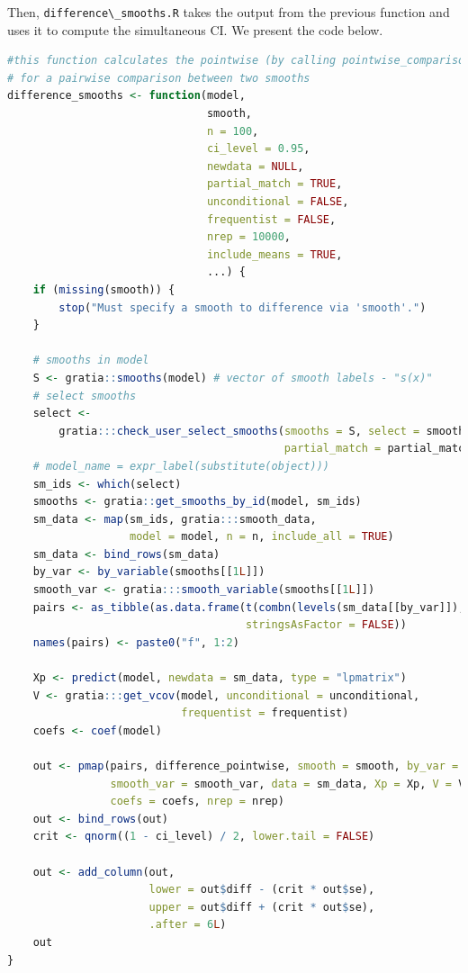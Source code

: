 \documentclass[
]{article}
\newcommand{\passthrough}[1]{#1}
\begin{document}
Then, \passthrough{\lstinline!difference\_smooths.R!} takes the output from the previous function and uses it to compute the simultaneous CI.
We present the code below.

\begin{lstlisting}[language=R]
#this function calculates the pointwise (by calling pointwise_comparisons.R) CI and the simultaneous CI
# for a pairwise comparison between two smooths
difference_smooths <- function(model,
                               smooth,
                               n = 100,
                               ci_level = 0.95,
                               newdata = NULL,
                               partial_match = TRUE,
                               unconditional = FALSE,
                               frequentist = FALSE,
                               nrep = 10000,
                               include_means = TRUE,
                               ...) {
    if (missing(smooth)) {
        stop("Must specify a smooth to difference via 'smooth'.")
    }

    # smooths in model
    S <- gratia::smooths(model) # vector of smooth labels - "s(x)"
    # select smooths
    select <-
        gratia:::check_user_select_smooths(smooths = S, select = smooth,
                                           partial_match = partial_match)#,
    # model_name = expr_label(substitute(object)))
    sm_ids <- which(select)
    smooths <- gratia::get_smooths_by_id(model, sm_ids)
    sm_data <- map(sm_ids, gratia:::smooth_data,
                   model = model, n = n, include_all = TRUE)
    sm_data <- bind_rows(sm_data)
    by_var <- by_variable(smooths[[1L]])
    smooth_var <- gratia:::smooth_variable(smooths[[1L]])
    pairs <- as_tibble(as.data.frame(t(combn(levels(sm_data[[by_var]]), 2)),
                                     stringsAsFactor = FALSE))
    names(pairs) <- paste0("f", 1:2)

    Xp <- predict(model, newdata = sm_data, type = "lpmatrix")
    V <- gratia:::get_vcov(model, unconditional = unconditional,
                           frequentist = frequentist)
    coefs <- coef(model)

    out <- pmap(pairs, difference_pointwise, smooth = smooth, by_var = by_var,
                smooth_var = smooth_var, data = sm_data, Xp = Xp, V = V,
                coefs = coefs, nrep = nrep)
    out <- bind_rows(out)
    crit <- qnorm((1 - ci_level) / 2, lower.tail = FALSE)

    out <- add_column(out,
                      lower = out$diff - (crit * out$se),
                      upper = out$diff + (crit * out$se),
                      .after = 6L)
    out
}
\end{lstlisting}
\end{document}
